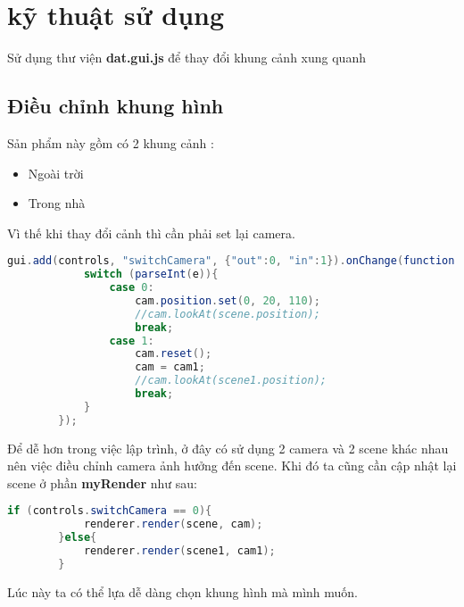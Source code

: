 \section{kỹ thuật sử dụng}
Sử dụng thư viện \textbf{dat.gui.js} để thay đổi khung cảnh xung quanh
\subsection{Điều chỉnh khung hình}
Sản phẩm này gồm có 2 khung cảnh :
\begin{itemize}
    \item Ngoài trời
    \item Trong nhà
\end{itemize}
Vì thế khi thay đổi cảnh thì cần phải set lại camera.
\begin{lstlisting}[language = java]
 gui.add(controls, "switchCamera", {"out":0, "in":1}).onChange(function(e){
            switch (parseInt(e)){
                case 0: 
                    cam.position.set(0, 20, 110);
                    //cam.lookAt(scene.position);
                    break;
                case 1: 
                    cam.reset();
                    cam = cam1;
                    //cam.lookAt(scene1.position);
                    break;
            }
        });
\end{lstlisting}

Để dễ hơn trong việc lập trình, ở đây có sử dụng 2 camera và 2 scene khác nhau nên việc điều chỉnh camera ảnh hưởng đến scene. Khi đó ta cũng cần cập nhật lại scene ở phần \textbf{myRender} như sau:
\begin{lstlisting}[language = java]
if (controls.switchCamera == 0){
            renderer.render(scene, cam);
        }else{
            renderer.render(scene1, cam1);
        } 
\end{lstlisting}

Lúc này ta có thể lựa dễ dàng chọn khung hình mà mình muốn.

